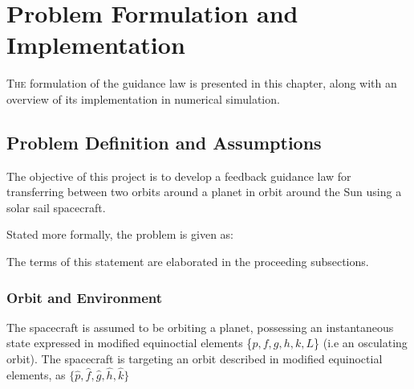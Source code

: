 \chapter{Problem Formulation and Implementation}

\lettrine{T}{he} formulation of the guidance law is presented in this chapter, along with an overview of its implementation in numerical simulation.

\section{Problem Definition and Assumptions}
The objective of this project is to develop a feedback guidance law for transferring between two orbits around a planet in orbit around the Sun using a solar sail spacecraft.

Stated more formally, the problem is given as:


The terms of this statement are elaborated in the proceeding subsections.

\subsection{Orbit and Environment}
\label{sec:orbit_environment}
The spacecraft is assumed to be orbiting a planet, possessing an instantaneous state expressed in modified equinoctial elements \{$p, f, g, h, k, L$\} (i.e an osculating orbit). The spacecraft is targeting an orbit described in modified equinoctial elements, as $\{\hat{p}, \hat{f}, \hat{g}, \hat{h}, \hat{k}\}$

